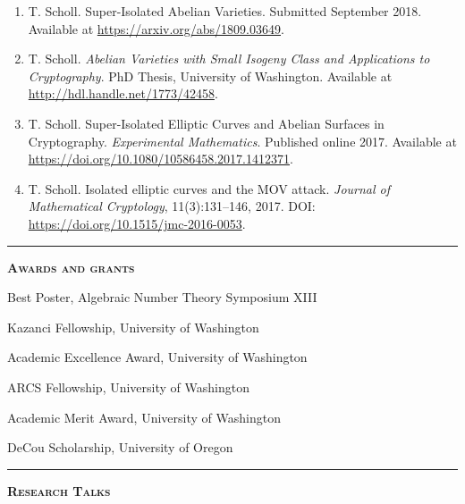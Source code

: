 \documentclass[12pt]{article}
\newcommand{\sectionheading}[1]
{
\bigskip %
\noindent
\hspace{-6.5mm}\textcolor{Gray}{\rule[.75mm]{21.5mm}{1mm}} %
\hspace{.2mm}	%
{\large{\textbf{\textsc{#1}}}} %
}
\newenvironment{date_section}
	{
	\vspace{-1ex}
	\leftmargini = 15ex
		\begin{itemize}[
			labelsep = *,
			labelwidth = 9ex,
			labelindent = 0ex,
			itemindent = !,
			font=\normalfont,
			align=parleft
		]{}
		\itemsep=-1.5mm
	}
	{\end{itemize}\vspace{-2ex}}
\newcommand{\yearmo}[2]{
	\item[
		{\makebox[1ex][r]{#1}}
		\hspace{1ex}
		{\makebox[1ex][l]{#2} }
		] }
\begin{document}
	\begin{enumerate}[itemsep=-1mm, leftmargin=24mm]

	\item T. Scholl. Super-Isolated Abelian Varieties. Submitted September 2018. Available at \url{https://arxiv.org/abs/1809.03649}.

\item T. Scholl. \emph{Abelian Varieties with Small Isogeny Class and Applications to Cryptography}. PhD Thesis, University of Washington. Available at \url{http://hdl.handle.net/1773/42458}.

	\item T. Scholl. Super-Isolated Elliptic Curves and Abelian Surfaces in Cryptography. \emph{Experimental Mathematics}. Published online 2017. Available at \url{https://doi.org/10.1080/10586458.2017.1412371}.

	\item T. Scholl. Isolated elliptic curves and the MOV attack. \emph{Journal of Mathematical Cryptology}, 11(3):131--146, 2017. DOI: \url{https://doi.org/10.1515/jmc-2016-0053}.

	\end{enumerate}






	\sectionheading{Awards and grants}%

	\begin{date_section}
		\yearmo{}{2018} %
		Best Poster, Algebraic Number Theory Symposium XIII
		\yearmo{}{2017}%
		Kazanci Fellowship, University of Washington
		\yearmo{}{2014}%
		Academic Excellence Award, University of Washington
		\yearmo{}{2013}%
		ARCS Fellowship, University of Washington
		\yearmo{}{2013}%
		Academic Merit Award, University of Washington
		\yearmo{}{2012}%
		DeCou Scholarship, University of Oregon
	\end{date_section}






	\sectionheading{Research Talks} %
\end{document}

